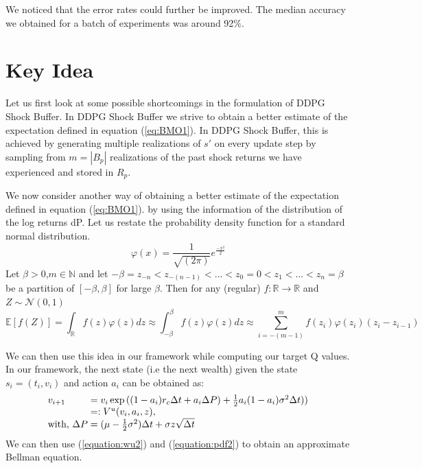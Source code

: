We noticed that the error rates could further be improved. The median accuracy we obtained for a batch of experiments was around 92\%.

\section{Key Idea}

Let us first look at some possible shortcomings in the formulation of DDPG Shock Buffer. In  DDPG Shock Buffer we strive to obtain a better estimate of the expectation defined in equation (\ref{eq:BMO1}). In DDPG Shock Buffer, this is achieved by generating multiple realizations of $s'$ on every update step by sampling from $m=|B_p|$ realizations of the past shock returns we have experienced and stored in $R_p$.

We now consider another way of obtaining  a better estimate  of the expectation defined in equation (\ref{eq:BMO1}). by using the information of the distribution of the log returns dP. Let us restate the probability density function for a standard normal distribution.
\begin{equation}\label{equation:pdf}
\varphi(x)= \frac{1}{\sqrt{(2\pi)}}e^{\frac{-x^2}{2}}
\end{equation}
Let $\beta>0$,$m \in \mathbb{N}$  and let $-\beta=z_{-n}<z_{-(n-1)}<...<z_0=0<z_1<...<z_n=\beta$ be a partition of $[-\beta,\beta]$ for large $\beta$.
Then for any (regular) $f:\mathbb{R} \rightarrow \mathbb{R}$ and $Z \sim \mathcal{N}(0,1)$
\begin{equation}\label{equation:pdf2}
\mathbb{E}[f(Z)] = \int_\mathbb{R}f(z)\varphi(z)dz \approx \int_{-\beta}^{\beta}f(z)\varphi(z) dz \approx \sum_{i=-(m-1)}^{m} f(z_i)\varphi(z_i)(z_i-z_{i-1})
\end{equation}

We can then use this idea in our framework while computing our target Q values. In our framework, the next state (i.e the next wealth) given the state $s_i = (t_i,v_i)$ and action $a_i$ can be obtained as:
\begin{equation}\label{equation:wu2}
    \begin{array}{l@{}l}
v_{i+1} 
 &{}= v_i\exp{((1-a_i)r_c\Delta t + a_i\Delta P) + \frac{1}{2}a_i(1-a_i)\sigma^2\Delta t))}\\
 &{}=: V^u(v_i,a_i,z),\\
\textrm{with, }\Delta P &{}= (\mu - \frac{1}{2}\sigma^2)\Delta t + \sigma z \sqrt{\Delta t}
\end{array}
\end{equation}
We can then use (\ref{equation:wu2}) and (\ref{equation:pdf2}) to obtain an approximate Bellman equation.

